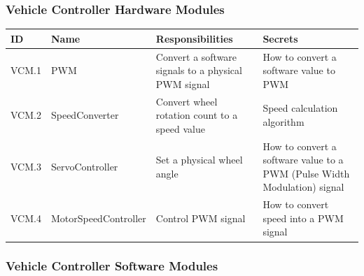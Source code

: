 \documentclass [10pt]{article}
\begin{document}
\subsubsection{Vehicle Controller Hardware Modules}

\begin{longtable}{ |p{ }  | p{ } |  p{ } |  p{ } |}  \hline
    
    \textbf{ID} & \textbf{Name} &  \textbf{Responsibilities} & \textbf{Secrets} \\ \hline 
    
    
    \cellcolor{tableCell}VCM.1  & \cellcolor{tableCell}PWM & \cellcolor{tableCell}Convert a software signals to a physical PWM signal & \cellcolor{tableCell}How to convert a software value to PWM  \\ \hline
    
    VCM.2 & SpeedConverter & Convert wheel rotation count to a speed value & Speed calculation algorithm \\ \hline
    
    \cellcolor{tableCell}VCM.3  & \cellcolor{tableCell}ServoController & \cellcolor{tableCell}Set a physical wheel angle & 
    \cellcolor{tableCell}How to convert a software value to a PWM (Pulse Width Modulation) signal \\ \hline
    
    VCM.4 & MotorSpeedController & Control PWM signal & How to convert speed into a PWM signal \\ \hline\hline
    
\end{longtable}


\subsubsection{Vehicle Controller Software Modules}
\end{document}
